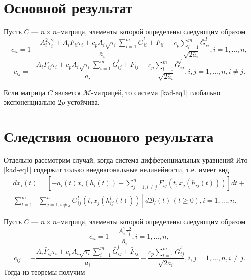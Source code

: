 \section{Основной результат}

Пусть $C$ --- $n\times n$--матрица, элементы которой определены
следующим образом
$$
c_{ii} = 1 - \frac{A_i^2\tau _i^2 + A_i\bar F_{ii}\tau _i  + c_p A_i
\sqrt{\tau _i}\sum \limits _{i=1}^m\bar G^l_{ii} + \bar F_{ii}}{\bar
a_i} - \frac{c_p\sum \limits _{l=1}^m \bar G^l_{ii}}{\sqrt{2\bar
a_i}}, i = 1,...,n,
$$
$$
c_{ij} = - \frac{A_i\bar F_{ij}\tau _i + c_p A_i \sqrt{\tau _i}\sum
\limits _{i=1}^m\bar G^l_{ij} + \bar F_{ij}}{\bar a_i} -
\frac{c_p\sum \limits _{l=1}^m \bar G^l_{ij}}{\sqrt{2\bar a_i}}, i,j
= 1,...,n, i\neq j.
$$

\begin{theorem*}
  Если матрица $C$ является $\mathcal{
M}$-матрицей, то система \eqref{kad-eq1} глобально экспоненциально
$2p$-устойчива.
\end{theorem*}

\section{Следствия основного результата}

Отдельно рассмотрим случай, когда система дифференциальных уравнений
Ито \eqref{kad-eq1} содержит только внедиагональные  нелинейности, т.е. имеет
вид
\begin{equation}\label{kad-eq14}
\begin{array}{crl}
dx_i(t) = \left [-a_i(t)x_i(h_i(t))+ \sum
\limits_{j=1, i \neq j }^nF_{ij}(t,x_j(h_{ij}(t)))\right]dt +\\
 \sum \limits_{l=1}^m \left [\sum
\limits_{j=1, i \neq j}^nG^l_{ij}(t,x_j(h^l_{ij}(t)))\right
]d\mathcal B_l(t) \, (t \ge 0), i = 1,...,n.
\end{array}
\end{equation}


Пусть $C$ --- $n\times n$--матрица, элементы которой определены
следующим образом
$$
c_{ii} = 1 - \frac{A_i^2\tau _i^2}{\bar a_i}, i = 1,...,n,
$$
$$
c_{ij} = - \frac{A_i\bar F_{ij}\tau _i + c_p A_i \sqrt{\tau _i}\sum
\limits _{i=1}^m\bar G^l_{ij} + \bar F_{ij}}{\bar a_i}
-\frac{c_p\sum \limits _{l=1}^m \bar G^l_{ij}}{\sqrt{2\bar a_i}},
i,j = 1,...,n, i\neq j.
$$
Тогда из теоремы получим

